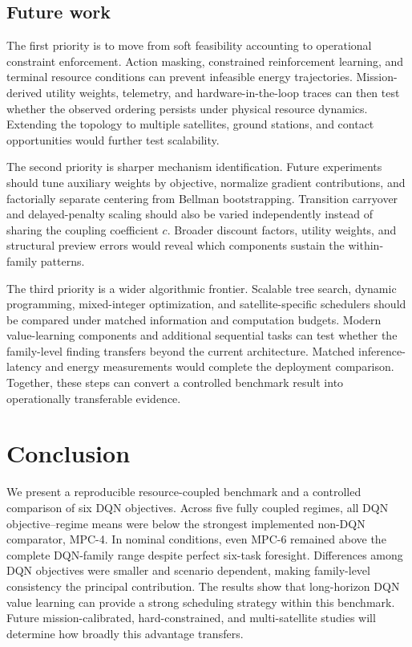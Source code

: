 \documentclass[11pt]{article}
\begin{document}
\color{red}%
\subsection{Future work}

The first priority is to move from soft feasibility accounting to operational constraint enforcement. Action masking, constrained reinforcement learning, and terminal resource conditions can prevent infeasible energy trajectories. Mission-derived utility weights, telemetry, and hardware-in-the-loop traces can then test whether the observed ordering persists under physical resource dynamics. Extending the topology to multiple satellites, ground stations, and contact opportunities would further test scalability.

The second priority is sharper mechanism identification. Future experiments should tune auxiliary weights by objective, normalize gradient contributions, and factorially separate centering from Bellman bootstrapping. Transition carryover and delayed-penalty scaling should also be varied independently instead of sharing the coupling coefficient $c$. Broader discount factors, utility weights, and structural preview errors would reveal which components sustain the within-family patterns.

The third priority is a wider algorithmic frontier. Scalable tree search, dynamic programming, mixed-integer optimization, and satellite-specific schedulers should be compared under matched information and computation budgets. Modern value-learning components and additional sequential tasks can test whether the family-level finding transfers beyond the current architecture. Matched inference-latency and energy measurements would complete the deployment comparison. Together, these steps can convert a controlled benchmark result into operationally transferable evidence.
\color{black}%

\section{Conclusion}

\color{red}%
We present a reproducible resource-coupled benchmark and a controlled comparison of six DQN objectives. Across five fully coupled regimes, all \DQNFamilyBelowMPCCount{} DQN objective--regime means were below the strongest implemented non-DQN comparator, MPC-4. In nominal conditions, even MPC-6 remained above the complete DQN-family range despite perfect six-task foresight. Differences among DQN objectives were smaller and scenario dependent, making family-level consistency the principal contribution. The results show that long-horizon DQN value learning can provide a strong scheduling strategy within this benchmark. Future mission-calibrated, hard-constrained, and multi-satellite studies will determine how broadly this advantage transfers.
\color{black}%
\end{document}
